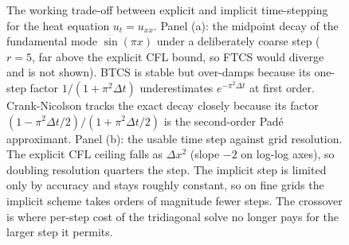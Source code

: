 \begin{figure}[htbp]
\caption[Explicit versus implicit trade-off]{The working trade-off
between explicit and implicit time-stepping for the heat equation
$u_t = u_{xx}$. Panel (a): the midpoint decay of the fundamental
mode $\sin(\pi x)$ under a deliberately coarse step ($r = 5$, far
above the explicit CFL bound, so FTCS would diverge and is not
shown). BTCS is stable but over-damps because its one-step factor
$1/(1 + \pi^2 \Delta t)$ underestimates $e^{-\pi^2 \Delta t}$ at
first order. Crank-Nicolson tracks the exact decay closely because
its factor $(1 - \pi^2 \Delta t/2)/(1 + \pi^2 \Delta t/2)$ is the
second-order Pad\'e approximant. Panel (b): the usable time step
against grid resolution. The explicit CFL ceiling falls as $\Delta
x^{2}$ (slope $-2$ on log-log axes), so doubling resolution quarters
the step. The implicit step is limited only by accuracy and stays
roughly constant, so on fine grids the implicit scheme takes orders
of magnitude fewer steps. The crossover is where per-step cost of
the tridiagonal solve no longer pays for the larger step it
permits.}
\label{fig:vol02:ch12:explicit-implicit}
\end{figure}
